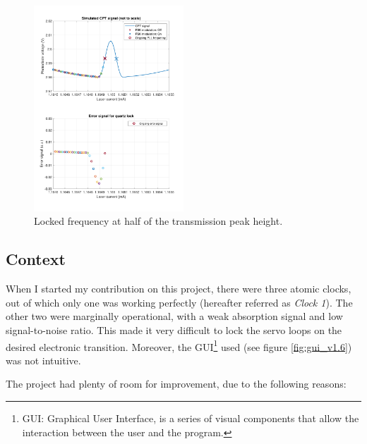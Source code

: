 \documentclass[a4paper,12pt]{article}
\begin{document}
\begin{figure}[h!]
	\centering
	\includegraphics[width=0.5\textwidth]{animation_quartz_servo_loop/quartz_28.pdf}
	\caption{Locked frequency at half of the transmission peak height.}
	\label{fig:transmission_peak}
\end{figure}

\newpage
\subsection{Context}
When I started my contribution on this project, there were three atomic clocks, out of which only one was working perfectly (hereafter referred as \textit{Clock 1}). The other two were marginally operational, with a weak absorption signal and low signal-to-noise ratio. This made it very difficult to lock the servo loops on the desired electronic transition. Moreover, the GUI\footnote{GUI: Graphical User Interface, is a series of visual components that allow the interaction between the user and the program.} used (see figure \ref{fig:gui_v1.6}) was not intuitive.

The project had plenty of room for improvement, due to  the following reasons:
\end{document}
